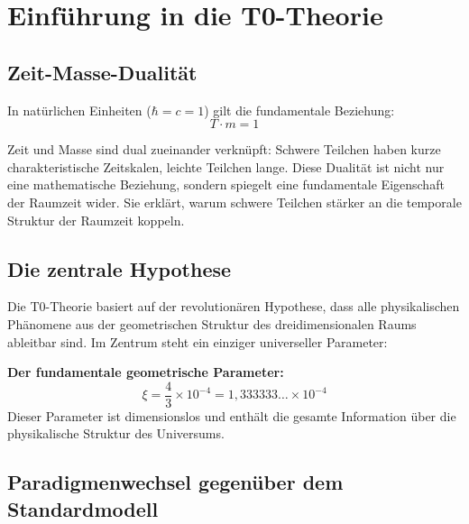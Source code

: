 \documentclass[12pt,a4paper]{article}
\begin{document}
	\tableofcontents
	
	\section{Einführung in die T0-Theorie}
	
	\subsection{Zeit-Masse-Dualität}
	
	In natürlichen Einheiten ($\hbar = c = 1$) gilt die fundamentale Beziehung:
	\begin{equation}
		T \cdot m = 1
		\label{eq:time_mass_duality}
	\end{equation}
	
	Zeit und Masse sind dual zueinander verknüpft: Schwere Teilchen haben kurze charakteristische Zeitskalen, leichte Teilchen lange. Diese Dualität ist nicht nur eine mathematische Beziehung, sondern spiegelt eine fundamentale Eigenschaft der Raumzeit wider. Sie erklärt, warum schwere Teilchen stärker an die temporale Struktur der Raumzeit koppeln.
	
	\subsection{Die zentrale Hypothese}
	
	Die T0-Theorie basiert auf der revolutionären Hypothese, dass alle physikalischen Phänomene aus der geometrischen Struktur des dreidimensionalen Raums ableitbar sind. Im Zentrum steht ein einziger universeller Parameter:
	
	\begin{foundation}
		\textbf{Der fundamentale geometrische Parameter:}
		\begin{equation}
			\boxed{\xi = \frac{4}{3} \times 10^{-4} = 1{,}333333\dots \times 10^{-4}}
			\label{eq:xi_fundamental}
		\end{equation}
		Dieser Parameter ist dimensionslos und enthält die gesamte Information über die physikalische Struktur des Universums.
	\end{foundation}
	
	\subsection{Paradigmenwechsel gegenüber dem Standardmodell}
	
\end{document}
